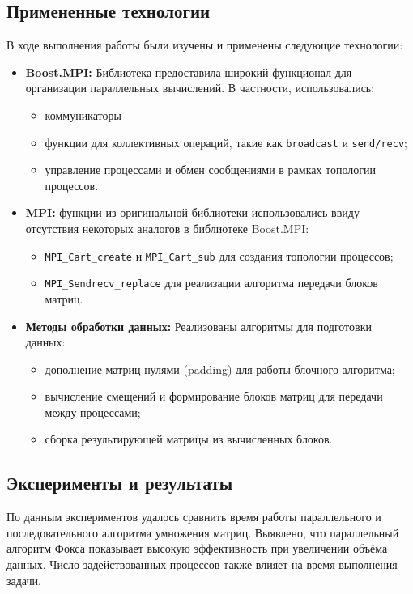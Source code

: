 \documentclass{report}
\begin{document}
\subsection*{Примененные технологии}

В ходе выполнения работы были изучены и применены следующие технологии:

\begin{itemize}
    \item \textbf{Boost.MPI:} Библиотека предоставила широкий функционал для организации параллельных вычислений. В частности, использовались:
    \begin{itemize}
        \item коммуникаторы
        \item функции для коллективных операций, такие как \texttt{broadcast} и \texttt{send/recv};
        \item управление процессами и обмен сообщениями в рамках топологии процессов.
    \end{itemize}
    \item \textbf{MPI:} функции из оригинальной библиотеки использовались ввиду отсутствия некоторых аналогов в библиотеке Boost.MPI:
    \begin{itemize}
        \item \texttt{MPI\_Cart\_create} и \texttt{MPI\_Cart\_sub} для создания топологии процессов;
        \item \texttt{MPI\_Sendrecv\_replace} для реализации алгоритма передачи блоков матриц.
    \end{itemize}
    \item \textbf{Методы обработки данных:} Реализованы алгоритмы для подготовки данных:
    \begin{itemize}
        \item дополнение матриц нулями (padding) для работы блочного алгоритма;
        \item вычисление смещений и формирование блоков матриц для передачи между процессами;
        \item сборка результирующей матрицы из вычисленных блоков.
    \end{itemize}
\end{itemize}

\subsection*{Эксперименты и результаты}
\par По данным экспериментов удалось сравнить время работы параллельного и последовательного алгоритма умножения матриц. Выявлено, что параллельный алгоритм Фокса показывает высокую эффективность при увеличении объёма данных. Число задействованных процессов также влияет на время выполнения задачи.
\end{document}
